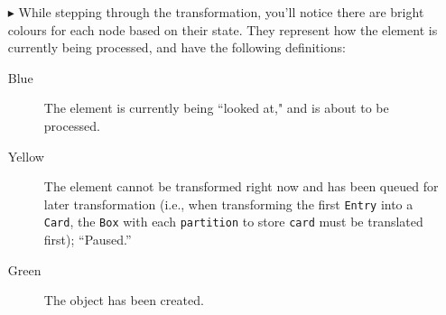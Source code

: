 \begin{itemize}
\clearpage

\item[$\blacktriangleright$] While stepping through the transformation, you'll notice there are bright colours for each node based on their state. They
represent how the element is currently being processed, and have the following definitions:

\begin{description}
  \item[Blue] The element is currently being ``looked at," and is about to be processed.
  
  \vspace{0.5cm}
  
  \item[Yellow] The element cannot be transformed right now and has been queued for later transformation (i.e., when transforming the first
  \texttt{Entry} into a \texttt{Card}, the \texttt{Box} with each \texttt{partition} to store \texttt{card} must be translated first); ``Paused.''
  
  \vspace{0.5cm}
  
  \item[Green] The object has been created.

\end{description}

\end{itemize}
